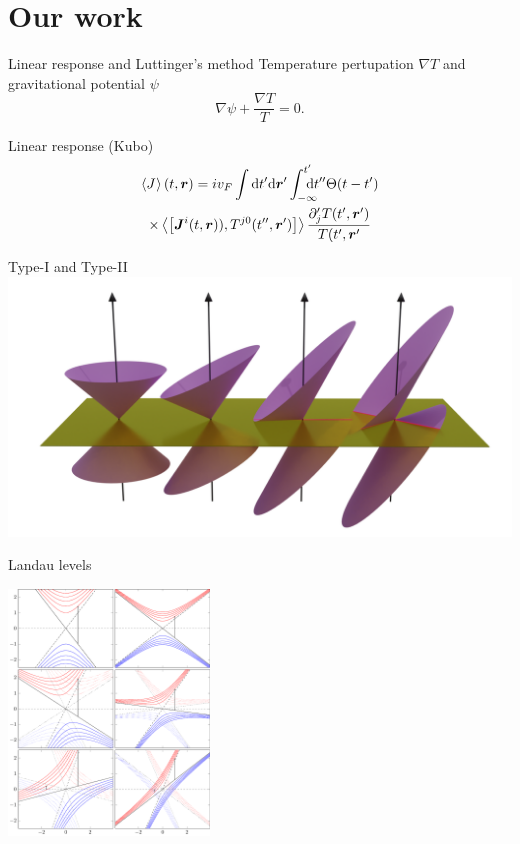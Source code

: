 \documentclass{beamer}
\renewcommand\vec\bm
\begin{document}
\section{Our work}
\begin{frame}{Linear response and Luttinger's method}
  Temperature pertupation \( \nabla T \) and gravitational potential \( \psi \)
  \begin{equation}
    \label{eq:3}
    \nabla \psi + \frac{\nabla T}{T} = 0.
  \end{equation}

  Linear response (Kubo)
  \begin{multline}
    \label{eq:4}
    \Braket{J^{}}(t, \vec{r}) =
    iv_F
    \int \mathrm{d}t' \mathrm{d} \vec{r}'
    \int_{-\infty}^{t'} \hspace{-1em} \mathrm{d}t''
    \Theta(t-t')\\
    \times
    \Braket{\left[
      \vec{J}^i(t, \vec{r})), T^{j0}(t'', \vec{r}')
\right      ]}
\frac{\partial_j' T(t', \vec{r}')}{T(t', \vec{r}'}
  \end{multline}
\end{frame}
\begin{frame}{Type-I and Type-II}
  \centering
  \includegraphics[width=.7\textwidth]{cones-tilt-color1}
\end{frame}
\begin{frame}{Landau levels}
  \begin{center}
    \includegraphics[width=0.4\textwidth]{lllevels}
  \end{center}
\end{frame}
\end{document}
